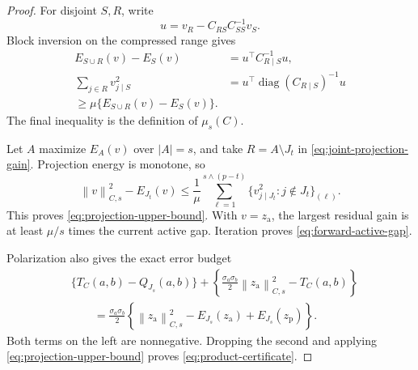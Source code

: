 \documentclass[a4paper,11pt,english]{article}
\newcommand{\norm}[1]{\left\lVert #1\right\rVert}
\begin{document}
\begin{proof}
For disjoint $S,R$, write
\begin{equation*}
        u=v_R-C_{RS}C_{SS}^{-1}v_S.
\end{equation*}
Block inversion on the compressed range gives
\begin{equation}\label{eq:joint-projection-gain}
\begin{split}
        E_{S\cup R}(v)-E_S(v)
        &=u^\top C_{R\mid S}^{-1}u,\\
        \sum_{j\in R}v_{j\mid S}^2
        &=u^\top\operatorname{diag}(C_{R\mid S})^{-1}u\\
        \ge\mu\{E_{S\cup R}(v)-E_S(v)\}.
\end{split}
\end{equation}
The final inequality is the definition of $\mu_s(C)$.

Let $A$ maximize $E_A(v)$ over $|A|=s$, and take $R=A\setminus J_t$ in
\eqref{eq:joint-projection-gain}.  Projection energy is monotone, so
\begin{equation*}
        \norm{v}_{C,s}^2-E_{J_t}(v)
        \le\frac1\mu
        \sum_{\ell=1}^{s\wedge(p-t)}
        \{v_{j\mid J_t}^2:j\notin J_t\}_{(\ell)}.
\end{equation*}
This proves \eqref{eq:projection-upper-bound}.  With $v=z_{\mathrm a}$, the largest
residual gain is at least $\mu/s$ times the current active gap.  Iteration
proves \eqref{eq:forward-active-gap}.

Polarization also gives the exact error budget
\begin{equation*}
\begin{split}
        &\{T_C(a,b)-Q_{J_s}(a,b)\}
        +\left\{\frac{\sigma_a\sigma_b}{2}
        \norm{z_{\mathrm a}}_{C,s}^2-T_C(a,b)\right\}\\
        &\qquad=\frac{\sigma_a\sigma_b}{2}
        \left\{\norm{z_{\mathrm a}}_{C,s}^2-E_{J_s}(z_{\mathrm a})+E_{J_s}(z_{\mathrm p})\right\}.
\end{split}
\end{equation*}
Both terms on the left are nonnegative.  Dropping the second and applying
\eqref{eq:projection-upper-bound} proves
\eqref{eq:product-certificate}.
\end{proof}
\end{document}
